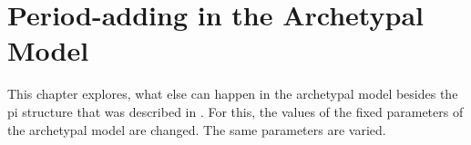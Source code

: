 \chapter{Period-adding in the Archetypal Model}
\label{chap:add}

This chapter explores, what else can happen in the archetypal model besides the \gls{pi} structure that was described in .
For this, the values of the fixed parameters of the archetypal model are changed.
The same parameters are varied.


\clearpage


